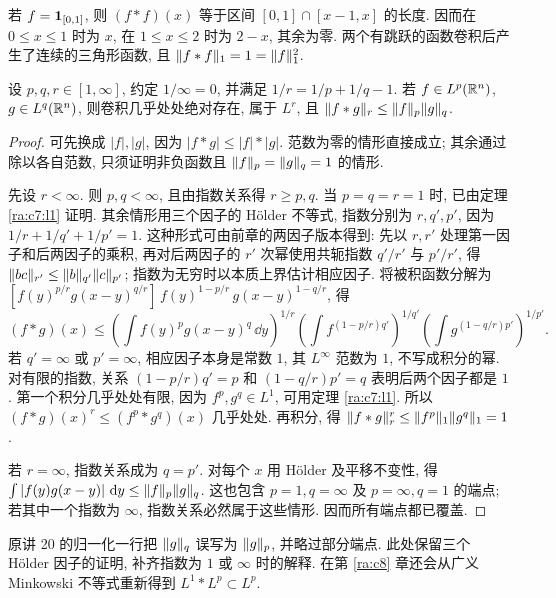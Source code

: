 \begin{example}
若 $f=\mathbf 1_{[0,1]}$, 则 $(f*f)(x)$ 等于区间 $[0,1]\cap[x-1,x]$ 的长度. 因而在 $0\le x\le1$ 时为 $x$, 在 $1\le x\le2$ 时为 $2-x$, 其余为零. 两个有跳跃的函数卷积后产生了连续的三角形函数, 且 $\lVert f*f\rVert_1=1=\lVert f\rVert_1^2$.
\end{example}


\begin{theorem}\label{ra:c7:young}
设 $p,q,r\in[1,\infty]$, 约定 $1/\infty=0$, 并满足
$1/r=1/p+1/q-1$. 若 $f\in L^p(\mathbb R^n)$, $g\in L^q(\mathbb R^n)$, 则卷积几乎处处绝对存在, 属于 $L^r$, 且
$\lVert f*g\rVert_r\le\lVert f\rVert_p\lVert g\rVert_q$.
\end{theorem}
\begin{proof}
可先换成 $|f|,|g|$, 因为 $|f*g|\le|f|*|g|$. 范数为零的情形直接成立; 其余通过除以各自范数, 只须证明非负函数且 $\lVert f\rVert_p=\lVert g\rVert_q=1$ 的情形.

先设 $r<\infty$. 则 $p,q<\infty$, 且由指数关系得 $r\ge p,q$. 当 $p=q=r=1$ 时, 已由定理 \ref{ra:c7:l1} 证明. 其余情形用三个因子的 Hölder 不等式, 指数分别为 $r,q',p'$, 因为 $1/r+1/q'+1/p'=1$. 这种形式可由前章的两因子版本得到: 先以 $r,r'$ 处理第一因子和后两因子的乘积, 再对后两因子的 $r'$ 次幂使用共轭指数 $q'/r'$ 与 $p'/r'$, 得 $\lVert bc\rVert_{r'}\le\lVert b\rVert_{q'}\lVert c\rVert_{p'}$; 指数为无穷时以本质上界估计相应因子. 将被积函数分解为
$[f(y)^{p/r}g(x-y)^{q/r}]\,f(y)^{1-p/r}\,g(x-y)^{1-q/r}$, 得
\[
 (f*g)(x)\le
 \left(\int f(y)^pg(x-y)^q\,\dd y\right)^{1/r}
 \left(\int f^{(1-p/r)q'}\right)^{1/q'}
 \left(\int g^{(1-q/r)p'}\right)^{1/p'}.
\]
若 $q'= \infty$ 或 $p'=\infty$, 相应因子本身是常数 $1$, 其 $L^\infty$ 范数为 $1$, 不写成积分的幂. 对有限的指数, 关系 $(1-p/r)q'=p$ 和 $(1-q/r)p'=q$ 表明后两个因子都是 $1$. 第一个积分几乎处处有限, 因为 $f^p,g^q\in L^1$, 可用定理 \ref{ra:c7:l1}. 所以
$(f*g)(x)^r\le(f^p*g^q)(x)$ 几乎处处. 再积分, 得 $\lVert f*g\rVert_r^r\le\lVert f^p\rVert_1\lVert g^q\rVert_1=1$.

若 $r=\infty$, 指数关系成为 $q=p'$. 对每个 $x$ 用 Hölder 及平移不变性, 得
$\int|f(y)g(x-y)|\,\,\mathrm d y\le\lVert f\rVert_p\lVert g\rVert_q$.
这也包含 $p=1,q=\infty$ 及 $p=\infty,q=1$ 的端点; 若其中一个指数为 $\infty$, 指数关系必然属于这些情形. 因而所有端点都已覆盖.
\end{proof}

\begin{remark}
原讲 20 的归一化一行把 $\lVert g\rVert_q$ 误写为 $\lVert g\rVert_p$, 并略过部分端点. 此处保留三个 Hölder 因子的证明, 补齐指数为 $1$ 或 $\infty$ 时的解释. 在第 \ref{ra:c8} 章还会从广义 Minkowski 不等式重新得到 $L^1*L^p\subset L^p$.
\end{remark}

